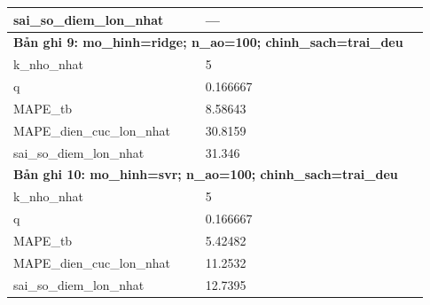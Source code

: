 \begin{longtable}{p{0.43\linewidth}p{0.50\linewidth}}
sai\_\allowbreak so\_\allowbreak diem\_\allowbreak lon\_\allowbreak nhat & — \\
\midrule
\multicolumn{2}{p{0.95\linewidth}}{\textbf{Bản ghi 9: mo\_hinh=ridge; n\_ao=100; chinh\_sach=trai\_deu}} \\
k\_\allowbreak nho\_\allowbreak nhat & 5 \\
q & 0.166667 \\
MAPE\_\allowbreak tb & 8.58643 \\
MAPE\_\allowbreak dien\_\allowbreak cuc\_\allowbreak lon\_\allowbreak nhat & 30.8159 \\
sai\_\allowbreak so\_\allowbreak diem\_\allowbreak lon\_\allowbreak nhat & 31.346 \\
\midrule
\multicolumn{2}{p{0.95\linewidth}}{\textbf{Bản ghi 10: mo\_hinh=svr; n\_ao=100; chinh\_sach=trai\_deu}} \\
k\_\allowbreak nho\_\allowbreak nhat & 5 \\
q & 0.166667 \\
MAPE\_\allowbreak tb & 5.42482 \\
MAPE\_\allowbreak dien\_\allowbreak cuc\_\allowbreak lon\_\allowbreak nhat & 11.2532 \\
sai\_\allowbreak so\_\allowbreak diem\_\allowbreak lon\_\allowbreak nhat & 12.7395 \\
\midrule
\bottomrule
\end{longtable}
